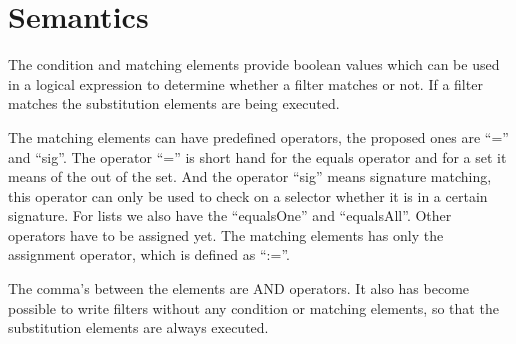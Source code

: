 \section*{Semantics}
The condition and matching elements provide boolean values which can be used in a logical expression to determine whether a filter matches or not. If a filter matches the substitution elements are being
executed.

The matching elements can have predefined operators, the proposed ones are ``='' and ``sig''.
The operator ``='' is
short hand for the equals operator and for a set it means of the out of the set. And the operator ``sig'' means
signature matching, this operator can only be used to check on a selector whether it is in a certain signature.
For lists we also have the ``equalsOne'' and ``equalsAll''. Other operators have to be assigned yet.
The matching elements has only the assignment operator, which is defined as ``:=''.

The comma's between the elements are AND operators. It also has become possible to write filters without any condition or matching elements, so that the substitution elements are always executed.

